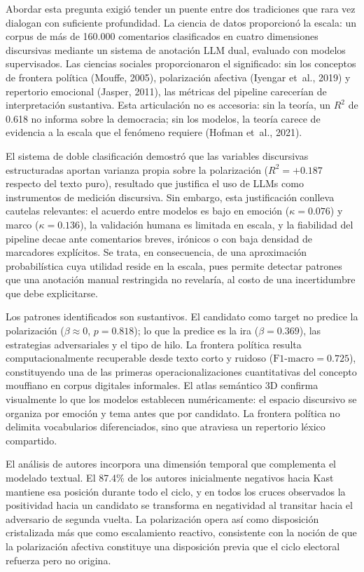 \documentclass[
  letterpaper,
  numbers=noendperiod,
  fontsize=11pt,
  DIV=12,
  titlepage=false]{scrreprt}
\begin{document}
Abordar esta pregunta exigió tender un puente entre dos tradiciones que
rara vez dialogan con suficiente profundidad. La ciencia de datos
proporcionó la escala: un corpus de más de 160.000 comentarios
clasificados en cuatro dimensiones discursivas mediante un sistema de
anotación LLM dual, evaluado con modelos supervisados. Las ciencias
sociales proporcionaron el significado: sin los conceptos de frontera
política (Mouffe, 2005), polarización afectiva (Iyengar et~al., 2019) y
repertorio emocional (Jasper, 2011), las métricas del pipeline
carecerían de interpretación sustantiva. Esta articulación no es
accesoria: sin la teoría, un \(R^2\) de 0.618 no informa sobre la
democracia; sin los modelos, la teoría carece de evidencia a la escala
que el fenómeno requiere (Hofman et~al., 2021).

El sistema de doble clasificación demostró que las variables discursivas
estructuradas aportan varianza propia sobre la polarización
(\(R^2 = +0.187\) respecto del texto puro), resultado que justifica el
uso de LLMs como instrumentos de medición discursiva. Sin embargo, esta
justificación conlleva cautelas relevantes: el acuerdo entre modelos es
bajo en emoción (\(\kappa = 0.076\)) y marco (\(\kappa = 0.136\)), la
validación humana es limitada en escala, y la fiabilidad del pipeline
decae ante comentarios breves, irónicos o con baja densidad de
marcadores explícitos. Se trata, en consecuencia, de una aproximación
probabilística cuya utilidad reside en la escala, pues permite detectar
patrones que una anotación manual restringida no revelaría, al costo de
una incertidumbre que debe explicitarse.

Los patrones identificados son sustantivos. El candidato como target no
predice la polarización (\(\beta \approx 0\), \(p = 0.818\)); lo que la
predice es la ira (\(\beta = 0.369\)), las estrategias adversariales y
el tipo de hilo. La frontera política resulta computacionalmente
recuperable desde texto corto y ruidoso (\(\mbox{F1-macro} = 0.725\)),
constituyendo una de las primeras operacionalizaciones cuantitativas del
concepto mouffiano en corpus digitales informales. El atlas semántico 3D
confirma visualmente lo que los modelos establecen numéricamente: el
espacio discursivo se organiza por emoción y tema antes que por
candidato. La frontera política no delimita vocabularios diferenciados,
sino que atraviesa un repertorio léxico compartido.

El análisis de autores incorpora una dimensión temporal que complementa
el modelado textual. El 87.4\% de los autores inicialmente negativos
hacia Kast mantiene esa posición durante todo el ciclo, y en todos los
cruces observados la positividad hacia un candidato se transforma en
negatividad al transitar hacia el adversario de segunda vuelta. La
polarización opera así como disposición cristalizada más que como
escalamiento reactivo, consistente con la noción de que la polarización
afectiva constituye una disposición previa que el ciclo electoral
refuerza pero no origina.
\end{document}
